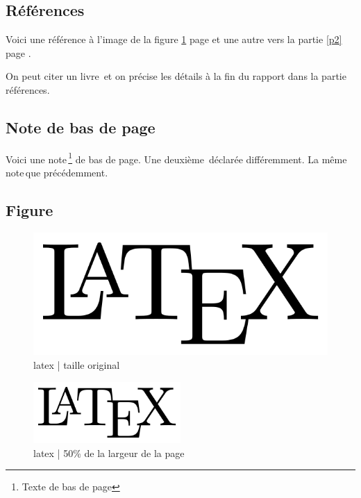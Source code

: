 %
\subsection{Références}

Voici une référence à l'image de la figure \ref{latex} page \pageref{latex} et une autre vers la partie \ref{p2} page \pageref{p2}.

On peut citer un livre\, et on précise les détails à la fin du rapport dans la partie références.


%
\subsection{Note de bas de page}

Voici une note\,\footnote{Texte de bas de page} de bas de page.
Une deuxième\,\footnotemark{} déclarée différemment.
La même note\,\footnotemark[\value{footnote}] que précédemment.



%
\subsection{Figure}

\begin{figure}[!ht]
    \center
    \includegraphics[]{./images/LaTeX_logo.png}
    \caption{latex | taille original}
    \label{latex}
\end{figure}

\begin{figure}[!ht]
    \center
    \includegraphics[width=0.5\textwidth]{./images/LaTeX_logo.png}
    \caption{latex | 50\% de la largeur de la page}
\end{figure}




